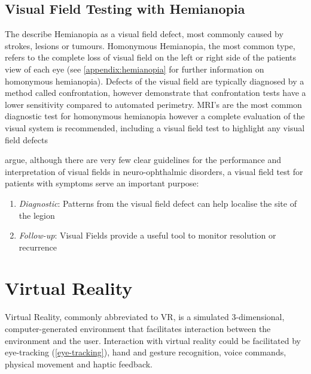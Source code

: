 \documentclass{l4proj}
\begin{document}
\subsection{Visual Field Testing with Hemianopia} \label{background:VFT_Hemianopia}
The \citet{BIOS2016VisualFieldLoss}  describe Hemianopia as a visual field defect, most commonly caused by strokes, lesions or tumours. Homonymous Hemianopia, the most common type, refers to the complete loss of visual field on the left or right side of the patients view of each eye (see \ref{appendix:hemianopia} for further information on homonymous hemianopia). Defects of the visual field are typically diagnosed by a method called confrontation, however \citet{Pandit2001VisualFields} demonstrate that confrontation tests have a lower sensitivity compared to automated perimetry. MRI's are the most common diagnostic test for homonymous hemianopia however a complete evaluation of the visual system is recommended, including a visual field test to highlight any visual field defects \citep{NANOS2021HomonymousHemianopia}

\citet{Kedar2011VisualFields} argue, although there are very few clear guidelines for the performance and interpretation of visual fields in neuro-ophthalmic disorders, a visual field test for patients with symptoms serve an important purpose:
\begin{enumerate}
\item \textit{Diagnostic}: Patterns from the visual field defect can help localise the site of the legion
\item \textit{Follow-up}: Visual Fields provide a useful tool to monitor resolution or recurrence
\end{enumerate}

\section{Virtual Reality} \label{background:VR}

Virtual Reality, commonly abbreviated to VR, is a simulated 3-dimensional, computer-generated environment that facilitates interaction between the environment and the user. Interaction with virtual reality could be facilitated by eye-tracking (\ref{eye-tracking}), hand and gesture recognition, voice commands, physical movement and haptic feedback.
\end{document}
